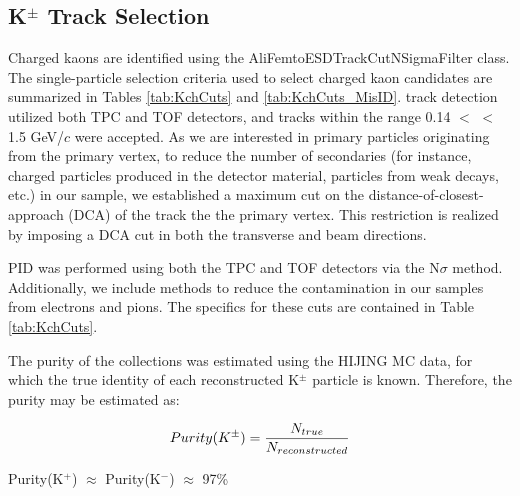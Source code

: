 \documentclass[/home/jesse/Analysis/FemtoAnalysis/AnalysisNotes/AnalysisNoteJBuxton.tex]{subfiles}
\begin{document}
\subsection{\texorpdfstring{K$^{\pm}$}{TEXT} Track Selection}
\label{KchTrackSelection}

Charged kaons are identified using the AliFemtoESDTrackCutNSigmaFilter class.
The single-particle selection criteria used to select charged kaon candidates are summarized in Tables \ref{tab:KchCuts} and \ref{tab:KchCuts_MisID}.
\Kpm track detection utilized both TPC and TOF detectors, and tracks within the range 0.14 $<$ \pt $<$ 1.5 GeV/$c$ were accepted.
As we are interested in primary particles originating from the primary vertex, to reduce the number of secondaries (for instance, charged particles produced in the detector material, particles from weak decays, etc.) in our sample, we established a maximum cut on the distance-of-closest-approach (DCA) of the track the the primary vertex.
This restriction is realized by imposing a DCA cut in both the transverse and beam directions.

PID was performed using both the TPC and TOF detectors via the $\mathrm{N}\sigma$ method.  
Additionally, we include methods to reduce the contamination in our \Kpm samples from electrons and pions.  
The specifics for these cuts are contained in Table \ref{tab:KchCuts}.

The purity of the \Kpm collections was estimated using the HIJING MC data, for which the true identity of each reconstructed K$^{\pm}$ particle is known.  Therefore, the purity may be estimated as:

\begin{equation}
 Purity(K^{\pm}) = \frac{N_{true}}{N_{reconstructed}} \\
\label{eqn:KchPurity}
\end{equation}

Purity(K$^{+}$) $\approx$ Purity(K$^{-}$) $\approx$ 97\%
\end{document}
